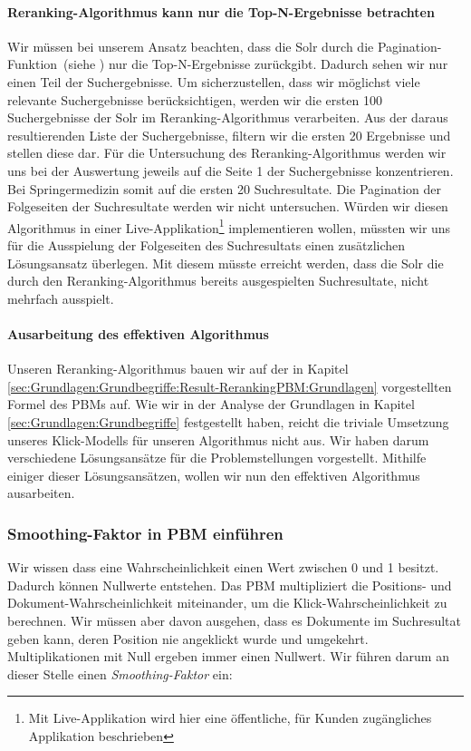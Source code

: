 \paragraph{Reranking-Algorithmus kann nur die Top-N-Ergebnisse betrachten}
Wir müssen bei unserem Ansatz beachten, dass die Solr durch die Pagination-Funktion~(siehe \cite{Pagination}) nur die Top-N-Ergebnisse zurückgibt. Dadurch sehen wir nur einen Teil der Suchergebnisse. Um sicherzustellen, dass wir möglichst viele relevante Suchergebnisse berücksichtigen, werden wir die ersten 100 Suchergebnisse der Solr im Reranking-Algorithmus verarbeiten. Aus der daraus resultierenden Liste der Suchergebnisse, filtern wir die ersten 20 Ergebnisse und stellen diese dar. Für die Untersuchung des Reranking-Algorithmus werden wir uns bei der Auswertung jeweils auf die Seite 1 der Suchergebnisse konzentrieren. Bei Springermedizin somit auf die ersten 20 Suchresultate. Die Pagination der Folgeseiten der Suchresultate werden wir nicht untersuchen. Würden wir diesen Algorithmus in einer Live-Applikation\footnote{Mit Live-Applikation wird hier eine öffentliche, für Kunden zugängliches Applikation beschrieben} implementieren wollen, müssten wir uns für die Ausspielung der Folgeseiten des Suchresultats einen zusätzlichen Lösungsansatz überlegen. Mit diesem müsste erreicht werden, dass die Solr die durch den Reranking-Algorithmus bereits ausgespielten Suchresultate, nicht mehrfach ausspielt.

\paragraph{Ausarbeitung des effektiven Algorithmus}
Unseren Reranking-Algorithmus bauen wir auf der in Kapitel \ref{sec:Grundlagen:Grundbegriffe:Result-RerankingPBM:Grundlagen} vorgestellten Formel des PBMs auf. Wie wir in der Analyse der Grundlagen in Kapitel \ref{sec:Grundlagen:Grundbegriffe} festgestellt haben, reicht die triviale Umsetzung unseres Klick-Modells für unseren Algorithmus nicht aus. Wir haben darum verschiedene Lösungsansätze für die Problemstellungen vorgestellt. Mithilfe einiger dieser Lösungsansätzen, wollen wir nun den effektiven Algorithmus ausarbeiten.

\subsubsection{Smoothing-Faktor in PBM einführen}
\label{sec:Reranking:Methodik:Result-RerankingPBM:SmoothingPBM}

Wir wissen dass eine Wahrscheinlichkeit einen Wert zwischen 0 und 1 besitzt. Dadurch können Nullwerte entstehen. Das PBM multipliziert die Positions- und Dokument-Wahrscheinlichkeit miteinander, um die Klick-Wahrscheinlichkeit zu berechnen. Wir müssen aber davon ausgehen, dass es Dokumente im Suchresultat geben kann, deren Position nie angeklickt wurde und umgekehrt. Multiplikationen mit Null ergeben immer einen Nullwert.  Wir führen darum an dieser Stelle einen \textit{Smoothing-Faktor} ein:

